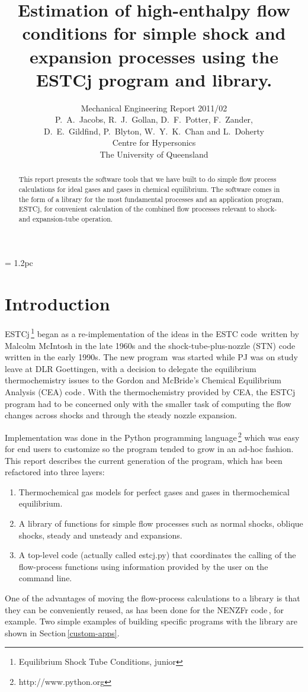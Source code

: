 \documentclass[10pt,a4paper]{article}
\title{
  Estimation of high-enthalpy flow conditions
  for simple shock and expansion processes using
  the ESTCj program and library.
}
\author{
  Mechanical Engineering Report 2011/02 \\
  P.~A.~Jacobs, R.~J.~Gollan, D.~F.~Potter, F.~Zander,\\
  D.~E.~Gildfind, P.~Blyton, W.~Y.~K.~Chan and L.~Doherty \\
  Centre for Hypersonics\\
  The University of Queensland
}
\begin{document}
\maketitle

\baselineskip = 1.2pc

\begin{abstract}
This report presents the software tools that we have built to do simple
flow process calculations for ideal gases and gases in chemical equilibrium.
The software comes in the form of a library for the most fundamental processes and
an application program, ESTCj, for convenient calculation of 
the combined flow processes relevant to shock- and expansion-tube operation.
\end{abstract}

\bigskip
\tableofcontents


\newpage
\section{Introduction}
%
ESTCj\,\footnote{Equilibrium Shock Tube Conditions, junior} 
began as a re-implementation of the ideas in the ESTC code\,\cite{mcintosh_70}
written by Malcolm McIntosh in the late 1960s and 
the shock-tube-plus-nozzle (STN) code\,\cite{krek_jacobs_93} written in the early 1990s.
The new program\,\cite{jacobs_gardner_2003a} was started 
while PJ was on study leave at DLR Goettingen,
with a decision to delegate the equilibrium thermochemistry issues to the 
Gordon and McBride's Chemical Equilibrium Analysis (CEA) 
code\,\cite{gordon_mcbride_1994,mcbride_gordon_1996}.
With the thermochemistry provided by CEA, the ESTCj program had to be concerned
only with the smaller task of computing the flow changes across shocks and through
the steady nozzle expansion.

\medskip
Implementation was done in the Python programming language\,\footnote{http://www.python.org}
which was easy for end users to customize so the program tended to grow in an ad-hoc fashion.
This report describes the current generation of the program, which has been refactored into
three layers:
\begin{enumerate}
 \item Thermochemical gas models for perfect gases and gases in thermochemical equilibrium.
 \item A library of functions for simple flow processes such as normal shocks, oblique shocks,
  steady and unsteady and expansions.
 \item A top-level code (actually called estcj.py) that coordinates the calling 
  of the flow-process functions using information provided by the user on the command line.
\end{enumerate}
One of the advantages of moving the flow-process calculations to a library is that 
they can be conveniently reused, 
as has been done for the NENZFr code\,\cite{doherty_etal_2012a}, for example.
Two simple examples of building specific programs with the library are shown in
Section\,\ref{custom-apps}.
\end{document}
